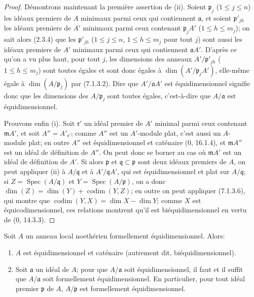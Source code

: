 \begin{proof}
Démontrons maintenant la première assertion de (ii). Soient $\mathfrak p_j$
($1\leqslant j\leqslant n$) les idéaux premiers de $A$ minimaux parmi ceux
qui contiennent $\mathfrak a$, et soient $\mathfrak p'_{jh}$ les idéaux
premiers de $A'$ minimaux parmi ceux contenant $\mathfrak p_jA'$
($1\leqslant h\leqslant m_j$); on sait alors (2.3.4) que les
$\mathfrak p'_{jh}$ ($1\leqslant j\leqslant n$, $1\leqslant h\leqslant
m_j$ pour tout $j$) sont aussi les idéaux premiers de $A'$ minimaux parmi
ceux qui contiennent $\mathfrak aA'$. D'après ce qu'on a vu plus haut, pour
tout $j$, les dimensions des anneaux $A'/\mathfrak p'_{jh}$
($1\leqslant h\leqslant m_j$) sont toutes égales et sont donc égales à
$\dim(A'/\mathfrak p_jA')$, elle-même égale à $\dim(A/\mathfrak p_j)$ par
(7.1.3.2). Dire que $A'/\mathfrak aA'$ est équidimensionnel signifie donc
que les dimensions des $A/\mathfrak p_j$ sont toutes égales, c'est-à-dire
que $A/\mathfrak a$ est équidimensionnel.

Prouvons enfin (i). Soit $\mathfrak r'$ un idéal premier de $A'$ minimal
parmi ceux contenant $\mathfrak mA'$, et soit $A''=A'_{\mathfrak r'}$;
comme $A''$ est un $A'$-module plat, c'est aussi un $A$-module plat; en
outre $A''$ est équidimensionnel et caténaire (0, 16.1.4), et
$\mathfrak mA''$ est un idéal de définition de $A''$. On peut donc se
borner au cas où $\mathfrak mA'$ est un idéal de définition de $A'$. Si
alors $\mathfrak p$ et $\mathfrak q\subset\mathfrak p$ sont deux idéaux
premiers de $A$, on peut appliquer (ii) à $A/\mathfrak q$ et à
$A'/\mathfrak qA'$, qui est équidimensionnel et plat sur
$A/\mathfrak q$; si $Z=\operatorname{Spec}(A/\mathfrak q)$ et
$Y=\operatorname{Spec}(A/\mathfrak p)$, on a donc
$\dim(Z)=\dim(Y)+\operatorname{codim}(Y,Z)$; en outre on peut appliquer
(7.1.3.6), qui montre que
$\operatorname{codim}(Y,X)=\dim X-\dim Y$; comme $X$ est
équicodimensionnel, ces relations montrent qu'il est biéquidimensionnel en
vertu de (0, 14.3.3).
\end{proof}

\begin{corollary}[7.1.4]
\label{IV.2.s7.1.4-fr}
Soit $A$ un anneau local noethérien formellement équidimensionnel. Alors:
\begin{enumerate}
\item[(i)] $A$ est équidimensionnel et caténaire (autrement dit,
biéquidimensionnel).
\item[(ii)] Soit $\mathfrak a$ un idéal de $A$; pour que $A/\mathfrak a$ soit
équidimensionnel, il faut et il suffit que $A/\mathfrak a$ soit formellement
équidimensionnel. En particulier, pour tout idéal premier $\mathfrak p$ de
$A$, $A/\mathfrak p$ est formellement équidimensionnel.
\end{enumerate}
\end{corollary}

